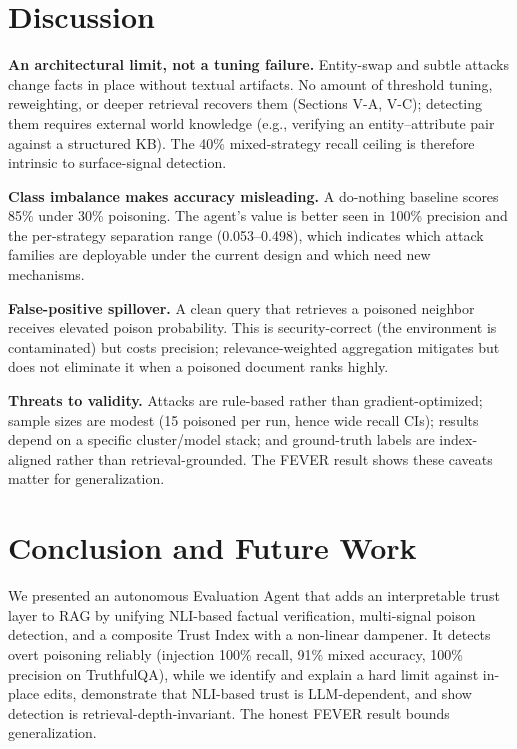 \documentclass[conference]{IEEEtran}
\begin{document}
\section{Discussion}
\textbf{An architectural limit, not a tuning failure.} Entity-swap and subtle
attacks change facts in place without textual artifacts. No amount of threshold
tuning, reweighting, or deeper retrieval recovers them (Sections V-A, V-C);
detecting them requires external world knowledge (e.g., verifying an
entity--attribute pair against a structured KB). The 40\% mixed-strategy recall
ceiling is therefore intrinsic to surface-signal detection.

\textbf{Class imbalance makes accuracy misleading.} A do-nothing baseline scores
85\% under 30\% poisoning. The agent's value is better seen in 100\% precision
and the per-strategy separation range (0.053--0.498), which indicates which
attack families are deployable under the current design and which need new
mechanisms.

\textbf{False-positive spillover.} A clean query that retrieves a poisoned
neighbor receives elevated poison probability. This is security-correct (the
environment is contaminated) but costs precision; relevance-weighted aggregation
mitigates but does not eliminate it when a poisoned document ranks highly.

\textbf{Threats to validity.} Attacks are rule-based rather than
gradient-optimized; sample sizes are modest (15 poisoned per run, hence wide
recall CIs); results depend on a specific cluster/model stack; and ground-truth
labels are index-aligned rather than retrieval-grounded. The FEVER result shows
these caveats matter for generalization.

\section{Conclusion and Future Work}
We presented an autonomous Evaluation Agent that adds an interpretable trust
layer to RAG by unifying NLI-based factual verification, multi-signal poison
detection, and a composite Trust Index with a non-linear dampener. It detects
overt poisoning reliably (injection 100\% recall, 91\% mixed accuracy, 100\%
precision on TruthfulQA), while we identify and explain a hard limit against
in-place edits, demonstrate that NLI-based trust is LLM-dependent, and show
detection is retrieval-depth-invariant. The honest FEVER result bounds
generalization.
\end{document}
